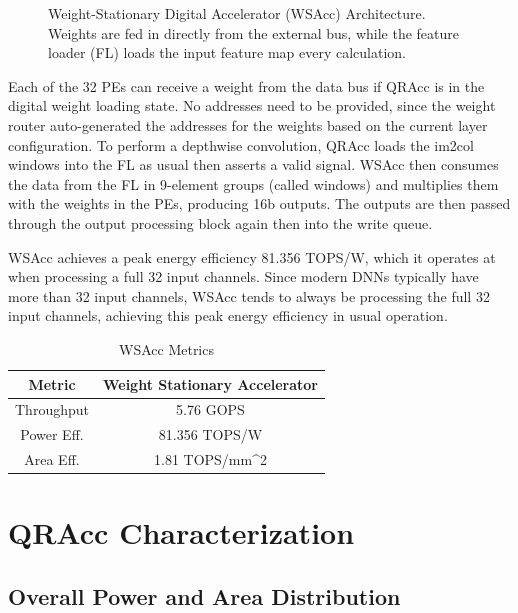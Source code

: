 \begin{figure}[htbp]
    \centering
    
    \caption{Weight-Stationary Digital Accelerator (WSAcc) Architecture. Weights are fed in directly from the external bus, while the feature loader (FL) loads the input feature map every calculation.}
    \label{fig:wsacc}
\end{figure}

Each of the 32 PEs can receive a weight from the data bus if QRAcc is in the digital weight loading state. No addresses need to be provided, since the weight router auto-generated the addresses for the weights based on the current layer configuration. To perform a depthwise convolution, QRAcc loads the im2col windows into the FL as usual then asserts a valid signal. WSAcc then consumes the data from the FL in 9-element groups (called windows) and multiplies them with the weights in the PEs, producing 16b outputs. The outputs are then passed through the output processing block again then into the write queue. 

WSAcc achieves a peak energy efficiency 81.356 TOPS/W, which it operates at when processing a full 32 input channels. Since modern DNNs typically have more than 32 input channels, WSAcc tends to always be processing the full 32 input channels, achieving this peak energy efficiency in usual operation. 

\begin{table}[]
\centering 
\label{tab:wsacc_metrics}
\caption{WSAcc Metrics}
\begin{tabular}{cc}
\hline
\textbf{Metric} & \textbf{Weight Stationary Accelerator} \\ \hline
Throughput      & 5.76 GOPS                              \\
Power Eff.      & 81.356 TOPS/W                          \\
Area Eff.       & 1.81 TOPS/mm\textasciicircum{}2       
\end{tabular}%
\end{table}


\section{QRAcc Characterization}

\subsection{Overall Power and Area Distribution}

